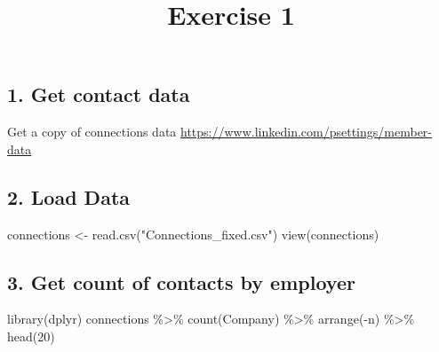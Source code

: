 \documentclass[
]{article}
\title{Exercise 1}
\author{}
\date{\vspace{-2.5em}}
\newenvironment{Shaded}{\begin{snugshade}}{\end{snugshade}}
\newcommand{\DecValTok}[1]{\textcolor[rgb]{0.00,0.00,0.81}{#1}}
\newcommand{\FunctionTok}[1]{\textcolor[rgb]{0.00,0.00,0.00}{#1}}
\newcommand{\NormalTok}[1]{#1}
\newcommand{\OtherTok}[1]{\textcolor[rgb]{0.56,0.35,0.01}{#1}}
\newcommand{\SpecialCharTok}[1]{\textcolor[rgb]{0.00,0.00,0.00}{#1}}
\newcommand{\StringTok}[1]{\textcolor[rgb]{0.31,0.60,0.02}{#1}}
\begin{document}
\maketitle

\hypertarget{get-contact-data}{%
\subsection{1. Get contact data}\label{get-contact-data}}

Get a copy of connections data
\url{https://www.linkedin.com/psettings/member-data}

\hypertarget{load-data}{%
\subsection{2. Load Data}\label{load-data}}

\begin{Shaded}
\begin{Highlighting}[]
\NormalTok{connections }\OtherTok{\textless{}{-}} \FunctionTok{read.csv}\NormalTok{(}\StringTok{"Connections\_fixed.csv"}\NormalTok{)}
\FunctionTok{view}\NormalTok{(connections)}
\end{Highlighting}
\end{Shaded}

\hypertarget{get-count-of-contacts-by-employer}{%
\subsection{3. Get count of contacts by
employer}\label{get-count-of-contacts-by-employer}}

\begin{Shaded}
\begin{Highlighting}[]
\FunctionTok{library}\NormalTok{(dplyr)}
\NormalTok{connections }\SpecialCharTok{\%\textgreater{}\%} \FunctionTok{count}\NormalTok{(Company) }\SpecialCharTok{\%\textgreater{}\%} \FunctionTok{arrange}\NormalTok{(}\SpecialCharTok{{-}}\NormalTok{n) }\SpecialCharTok{\%\textgreater{}\%} \FunctionTok{head}\NormalTok{(}\DecValTok{20}\NormalTok{)}
\end{Highlighting}
\end{Shaded}
\end{document}
